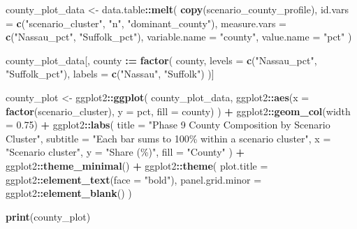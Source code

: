 \documentclass[
]{article}
\newenvironment{Shaded}{\begin{snugshade}}{\end{snugshade}}
\newcommand{\AttributeTok}[1]{\textcolor[rgb]{0.13,0.29,0.53}{#1}}
\newcommand{\FloatTok}[1]{\textcolor[rgb]{0.00,0.00,0.81}{#1}}
\newcommand{\FunctionTok}[1]{\textcolor[rgb]{0.13,0.29,0.53}{\textbf{#1}}}
\newcommand{\NormalTok}[1]{#1}
\newcommand{\OtherTok}[1]{\textcolor[rgb]{0.56,0.35,0.01}{#1}}
\newcommand{\SpecialCharTok}[1]{\textcolor[rgb]{0.81,0.36,0.00}{\textbf{#1}}}
\newcommand{\StringTok}[1]{\textcolor[rgb]{0.31,0.60,0.02}{#1}}
\begin{document}
\begin{Shaded}
\begin{Highlighting}[]
\NormalTok{county\_plot\_data }\OtherTok{\textless{}{-}}\NormalTok{ data.table}\SpecialCharTok{::}\FunctionTok{melt}\NormalTok{(}
  \FunctionTok{copy}\NormalTok{(scenario\_county\_profile),}
  \AttributeTok{id.vars =} \FunctionTok{c}\NormalTok{(}\StringTok{"scenario\_cluster"}\NormalTok{, }\StringTok{"n"}\NormalTok{, }\StringTok{"dominant\_county"}\NormalTok{),}
  \AttributeTok{measure.vars =} \FunctionTok{c}\NormalTok{(}\StringTok{"Nassau\_pct"}\NormalTok{, }\StringTok{"Suffolk\_pct"}\NormalTok{),}
  \AttributeTok{variable.name =} \StringTok{"county"}\NormalTok{,}
  \AttributeTok{value.name =} \StringTok{"pct"}
\NormalTok{)}

\NormalTok{county\_plot\_data[, county }\SpecialCharTok{:=} \FunctionTok{factor}\NormalTok{(}
\NormalTok{  county,}
  \AttributeTok{levels =} \FunctionTok{c}\NormalTok{(}\StringTok{"Nassau\_pct"}\NormalTok{, }\StringTok{"Suffolk\_pct"}\NormalTok{),}
  \AttributeTok{labels =} \FunctionTok{c}\NormalTok{(}\StringTok{"Nassau"}\NormalTok{, }\StringTok{"Suffolk"}\NormalTok{)}
\NormalTok{)]}

\NormalTok{county\_plot }\OtherTok{\textless{}{-}}\NormalTok{ ggplot2}\SpecialCharTok{::}\FunctionTok{ggplot}\NormalTok{(}
\NormalTok{  county\_plot\_data,}
\NormalTok{  ggplot2}\SpecialCharTok{::}\FunctionTok{aes}\NormalTok{(}\AttributeTok{x =} \FunctionTok{factor}\NormalTok{(scenario\_cluster), }\AttributeTok{y =}\NormalTok{ pct, }\AttributeTok{fill =}\NormalTok{ county)}
\NormalTok{) }\SpecialCharTok{+}
\NormalTok{  ggplot2}\SpecialCharTok{::}\FunctionTok{geom\_col}\NormalTok{(}\AttributeTok{width =} \FloatTok{0.75}\NormalTok{) }\SpecialCharTok{+}
\NormalTok{  ggplot2}\SpecialCharTok{::}\FunctionTok{labs}\NormalTok{(}
    \AttributeTok{title =} \StringTok{"Phase 9 County Composition by Scenario Cluster"}\NormalTok{,}
    \AttributeTok{subtitle =} \StringTok{"Each bar sums to 100\% within a scenario cluster"}\NormalTok{,}
    \AttributeTok{x =} \StringTok{"Scenario cluster"}\NormalTok{,}
    \AttributeTok{y =} \StringTok{"Share (\%)"}\NormalTok{,}
    \AttributeTok{fill =} \StringTok{"County"}
\NormalTok{  ) }\SpecialCharTok{+}
\NormalTok{  ggplot2}\SpecialCharTok{::}\FunctionTok{theme\_minimal}\NormalTok{() }\SpecialCharTok{+}
\NormalTok{  ggplot2}\SpecialCharTok{::}\FunctionTok{theme}\NormalTok{(}
    \AttributeTok{plot.title =}\NormalTok{ ggplot2}\SpecialCharTok{::}\FunctionTok{element\_text}\NormalTok{(}\AttributeTok{face =} \StringTok{"bold"}\NormalTok{),}
    \AttributeTok{panel.grid.minor =}\NormalTok{ ggplot2}\SpecialCharTok{::}\FunctionTok{element\_blank}\NormalTok{()}
\NormalTok{  )}

\FunctionTok{print}\NormalTok{(county\_plot)}
\end{Highlighting}
\end{Shaded}
\end{document}
